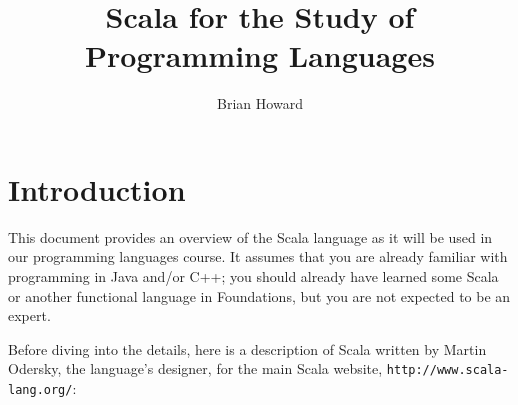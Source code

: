 \documentclass[11pt]{article}
\title{Scala for the Study of Programming Languages}
\author{Brian Howard}
\begin{document}
\maketitle
\section{Introduction}
This document provides an overview of the Scala language as it will be used in our programming languages course. It assumes that you are already familiar with programming in Java and/or C++; you should already have learned some Scala or another functional language in Foundations, but you are not expected to be an expert.

Before diving into the details, here is a description of Scala written by Martin Odersky, the language's designer, for the main Scala website, \texttt{http://www.scala-lang.org/}:
\end{document}
